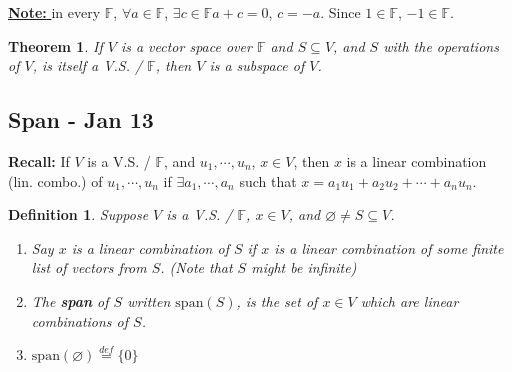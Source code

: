 \documentclass[12pt]{article}
\theoremstyle{plain}
\newtheorem{theorem}{Theorem}[subsection]
\newtheorem{definition}{Definition}[subsection]
\newcommand{\Span}{\mathrm{span}}
\newcommand{\mF}{{\mathbb{F}}}
\let\emptyset\varnothing
\begin{document}
	\underline{\textbf{Note: }}
	in every $\mathbb{F}$, $\forall a \in \mathbb{F}$,
	$\exists c \in \mathbb{F}$$a+c=0$, $c = -a$. 
	Since $1\in \mathbb{F}$, $-1\in \mathbb{F}$.\\

	\begin{theorem}
		If $V$ is a vector space over $\mathbb{F}$ and $S \subseteq V$, 
		and $S$ with the operations of $V$, is itself a V.S. / $\mathbb{F}$, 
		then $V$ is a subspace of $V$. 
	\end{theorem}
	




	\newpage
	\subsection{Span - Jan 13}
	\textbf{Recall:}
	If $V$ is a V.S. / $\mF$, and $u_1, \cdots, u_n$, $x\in V$, then 
	$x$ is a linear combination (lin. combo.) of $u_1, \cdots, u_n$ if 
	$\exists a_1, \cdots, a_n$ such that $x=a_1u_1+a_2u_2+\cdots+a_nu_n$.\\

	\begin{definition}
		Suppose $V$ is a V.S. / $\mF$, $x \in V$, and 
		$\emptyset \neq S \subseteq V$.
		\begin{enumerate}
			\item 
				Say $x$ is a linear combination of $S$ if $x$ is a linear 
				combination of some finite list of vectors from $S$. 
				(Note that $S$ might be infinite)

			\item The \textbf{span} of $S$ written $\Span(S)$, is the set of
				$x \in V$ which are linear combinations of $S$. 
			\item $\Span(\emptyset) \overset{def}{=} \{0\}$\\
		\end{enumerate}
	\end{definition}
\end{document}

